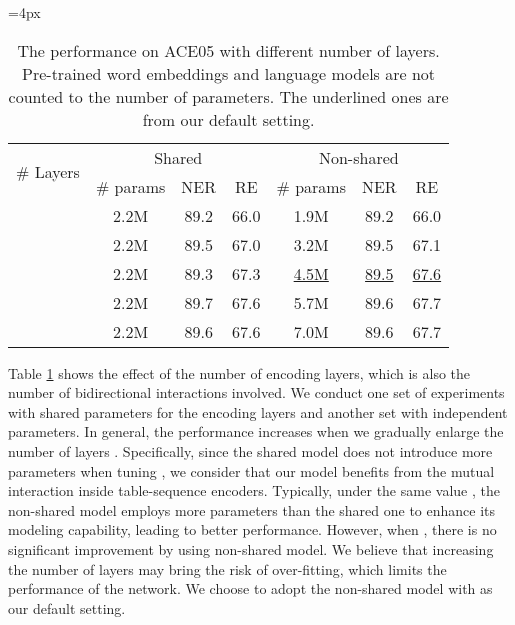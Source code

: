 \documentclass[11pt,a4paper]{article}
\begin{document}
\begin{table}[t!]
\centering
\tabcolsep=4px \scalebox{0.82}
{
\begin{tabular}{lcccccc}
\toprule
\multirow{2}{*}{\# Layers}
                  & \multicolumn{3}{c}{Shared}    & \multicolumn{3}{c}{Non-shared} \\
                  \cmidrule(l{5pt}r{5pt}){2-4} \cmidrule(l{5pt}r{5pt}){5-7}
                  & \# params & NER       & RE    & \# params & NER       & RE    \\ \midrule
             &   2.2M    & 89.2      & 66.0  &   1.9M    & 89.2      & 66.0   \\
             &   2.2M    & 89.5      & 67.0  &   3.2M    & 89.5      & 67.1   \\
             &   2.2M    & 89.3      & 67.3  &   \underline{4.5M}    & \underline{89.5}      & \underline{67.6}   \\
             &   2.2M    & 89.7      & 67.6  &   5.7M    & 89.6      & 67.7   \\
             &   2.2M    & 89.6      & 67.6  &   7.0M    & 89.6      & 67.7   \\
\bottomrule
\end{tabular}
}
\caption{
    The performance on ACE05 with different number of layers.
    Pre-trained word embeddings and language models are not counted to the number of parameters. 
    The underlined ones are from our default setting.
}
\label{tab:stack}
\end{table}

Table \ref{tab:stack} shows the effect of the number of encoding layers, which is also the number of bidirectional interactions involved.
We conduct one set of experiments with shared parameters for the encoding layers and another set with independent parameters.
In general, the performance increases when we gradually enlarge the number of layers .
Specifically, since the shared model does not introduce more parameters when tuning ,
we consider that our model benefits from the mutual interaction inside table-sequence encoders.
Typically, under the same value , the non-shared model employs more parameters than the shared one to enhance its modeling capability, leading to better performance.
However, when , there is no significant improvement by using non-shared model. We believe that increasing the number of layers may bring the risk of over-fitting, which limits the performance of the network. We choose to adopt the non-shared model with  as our default setting.
\end{document}
